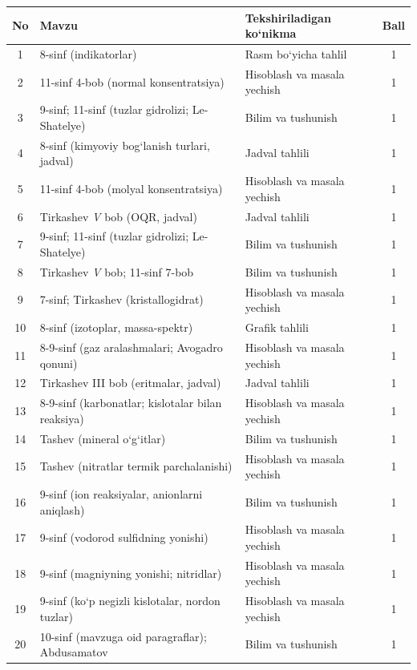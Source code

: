 \documentclass[11pt,a4paper]{article}
\begin{document}
{\small\noindent\begin{longtable}{|c|p{7.2cm}|p{5.4cm}|c|}\hline \textbf{No} & \textbf{Mavzu} & \textbf{Tekshiriladigan ko`nikma} & \textbf{Ball}\\\hline
1 & 8-sinf (indikatorlar) & Rasm bo`yicha tahlil & 1\\\hline
2 & 11-sinf 4-bob (normal konsentratsiya) & Hisoblash va masala yechish & 1\\\hline
3 & 9-sinf; 11-sinf (tuzlar gidrolizi; Le-Shatelye) & Bilim va tushunish & 1\\\hline
4 & 8-sinf (kimyoviy bog`lanish turlari, jadval) & Jadval tahlili & 1\\\hline
5 & 11-sinf 4-bob (molyal konsentratsiya) & Hisoblash va masala yechish & 1\\\hline
6 & Tirkashev \textit{V} bob (OQR, jadval) & Jadval tahlili & 1\\\hline
7 & 9-sinf; 11-sinf (tuzlar gidrolizi; Le-Shatelye) & Bilim va tushunish & 1\\\hline
8 & Tirkashev \textit{V} bob; 11-sinf 7-bob & Bilim va tushunish & 1\\\hline
9 & 7-sinf; Tirkashev (kristallogidrat) & Hisoblash va masala yechish & 1\\\hline
10 & 8-sinf (izotoplar, massa-spektr) & Grafik tahlili & 1\\\hline
11 & 8-9-sinf (gaz aralashmalari; Avogadro qonuni) & Hisoblash va masala yechish & 1\\\hline
12 & Tirkashev III bob (eritmalar, jadval) & Jadval tahlili & 1\\\hline
13 & 8-9-sinf (karbonatlar; kislotalar bilan reaksiya) & Hisoblash va masala yechish & 1\\\hline
14 & Tashev (mineral o`g`itlar) & Bilim va tushunish & 1\\\hline
15 & Tashev (nitratlar termik parchalanishi) & Hisoblash va masala yechish & 1\\\hline
16 & 9-sinf (ion reaksiyalar, anionlarni aniqlash) & Bilim va tushunish & 1\\\hline
17 & 9-sinf (vodorod sulfidning yonishi) & Hisoblash va masala yechish & 1\\\hline
18 & 9-sinf (magniyning yonishi; nitridlar) & Hisoblash va masala yechish & 1\\\hline
19 & 9-sinf (ko`p negizli kislotalar, nordon tuzlar) & Hisoblash va masala yechish & 1\\\hline
20 & 10-sinf (mavzuga oid paragraflar); Abdusamatov & Bilim va tushunish & 1\\\hline

\end{longtable}}
\end{document}
